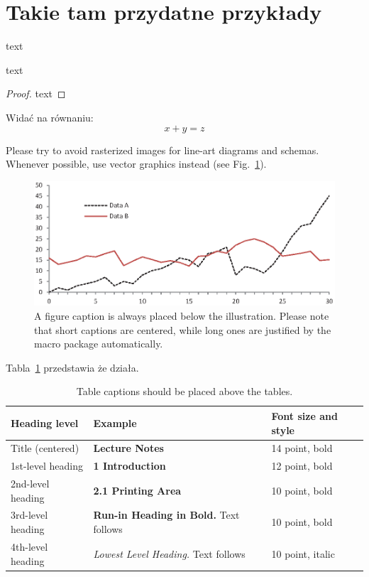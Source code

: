\documentclass[]{llncs}
\begin{document}

\newpage
\newpage

\section{Takie tam przydatne przykłady}
\begin{definition} text \end{definition}
\begin{case} text \end{case}
\begin{proof} text \end{proof}

\noindent Widać na równaniu:
\begin{equation}
  x + y = z
\end{equation}

Please try to avoid rasterized images for line-art diagrams and
schemas. Whenever possible, use vector graphics instead (see
Fig.~\ref{fig1}).

\begin{figure}
  \includegraphics[width=\textwidth]{fig1.eps}
  \caption{A figure caption is always placed below the illustration.
    Please note that short captions are centered, while long ones are
  justified by the macro package automatically.} \label{fig1}
\end{figure}

Tabla~\ref{tab1} przedstawia że działa.

\begin{table}
  \caption{Table captions should be placed above the
  tables.}\label{tab1}
  \begin{tabular}{|l|l|l|}
    \hline
    Heading level &  Example & Font size and style\\
    \hline
    Title (centered) &  {\Large\bfseries Lecture Notes} & 14 point, bold\\
    1st-level heading &  {\large\bfseries 1 Introduction} & 12 point, bold\\
    2nd-level heading & {\bfseries 2.1 Printing Area} & 10 point, bold\\
    3rd-level heading & {\bfseries Run-in Heading in Bold.} Text follows & 10 point, bold\\
    4th-level heading & {\itshape Lowest Level Heading.} Text follows & 10 point, italic\\
    \hline
  \end{tabular}
\end{table}

\end{document}
